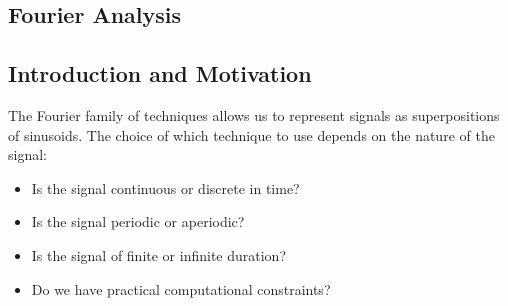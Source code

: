 \begin{notechapter}
\forgetcs\sinc{}
\forgetcs\rect{}
\forgetcs\R{}
\forgetcs\C{}
\forgetcs\Z{}
\forgetcs\N{}
\forgetcs\fourier{}
\forgetcs\abs\newcommand{\abs}[1]{\left|#1\right|}
\forgetcs\norm\newcommand{\norm}[1]{\left\|#1\right\|}
\forgetcs\inner\newcommand{\inner}[2]{\left\langle #1, #2 \right\rangle}
\chapter{Fourier Analysis}\label{ch:fourier-analysis}

\begin{abstract}
This document provides a mathematically rigorous treatment of the Fourier family of transforms: Fourier series, Fourier transform, Discrete-Time Fourier Transform (DTFT), Discrete Fourier Transform (DFT), and Fast Fourier Transform (FFT). We carefully establish the conditions under which each method applies, prove key theorems, and demonstrate the relationships between these techniques. The presentation assumes familiarity with real analysis, complex analysis, and linear algebra at the advanced undergraduate level.
\end{abstract}

\section{Introduction and Motivation}

The Fourier family of techniques allows us to represent signals as superpositions of sinusoids. The choice of which technique to use depends on the nature of the signal:

\begin{itemize}
\item Is the signal continuous or discrete in time?
\item Is the signal periodic or aperiodic?
\item Is the signal of finite or infinite duration?
\item Do we have practical computational constraints?
\end{itemize}


\end{notechapter}
